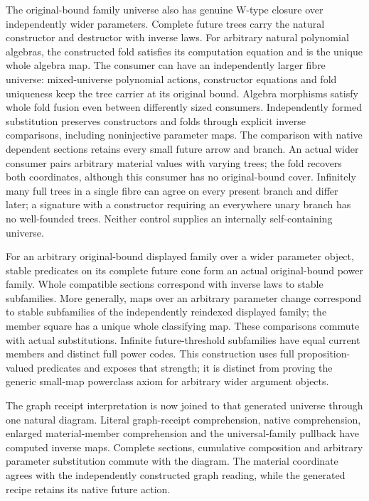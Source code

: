 \documentclass[11pt]{article}
\theoremstyle{definition}
\theoremstyle{remark}
\begin{document}
The original-bound family universe also has genuine W-type closure over
independently wider parameters. Complete future trees carry the natural
constructor and destructor with inverse laws. For arbitrary natural
polynomial algebras, the constructed fold satisfies its computation
equation and is the unique whole algebra map. The consumer can have an
independently larger fibre universe: mixed-universe polynomial actions,
constructor equations and fold uniqueness keep the tree carrier at its
original bound. Algebra morphisms satisfy whole fold fusion even between
differently sized consumers. Independently formed substitution preserves
constructors and folds through explicit inverse comparisons, including
noninjective parameter maps. The comparison with native dependent
sections retains every small future arrow and branch. An actual wider
consumer pairs arbitrary material values with varying trees; the fold
recovers both coordinates, although this consumer has no original-bound
cover.
Infinitely many full trees in a single fibre can agree on every present
branch and differ later; a signature with a constructor requiring an
everywhere unary branch has no well-founded trees. Neither control
supplies an internally self-containing universe.

For an arbitrary original-bound displayed family over a wider parameter
object, stable predicates on its complete future cone form an actual
original-bound power family. Whole compatible sections correspond with
inverse laws to stable subfamilies. More generally, maps over an arbitrary
parameter change correspond to stable subfamilies of the independently
reindexed displayed family; the member square has a unique whole
classifying map. These comparisons commute with actual substitutions.
Infinite future-threshold subfamilies have equal current members and
distinct full power codes. This construction uses full proposition-valued
predicates and exposes that strength; it is distinct from proving the
generic small-map powerclass axiom for arbitrary wider argument objects.

The graph receipt interpretation is now joined to that generated
universe through one natural diagram. Literal graph-receipt comprehension,
native comprehension, enlarged material-member comprehension and the
universal-family pullback have computed inverse maps. Complete sections,
cumulative composition and arbitrary parameter substitution commute with
the diagram. The material coordinate agrees with the independently
constructed graph reading, while the generated recipe retains its native
future action.
\end{document}
